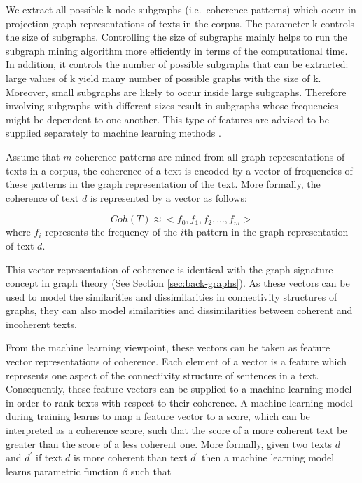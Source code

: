 We extract all possible k-node subgraphs (i.e.\ coherence patterns) which occur in projection graph representations of texts in the corpus. 
The parameter k controls the size of subgraphs.  
Controlling the size of subgraphs mainly helps to run the subgraph mining algorithm more efficiently in terms of the computational time.
In addition, it controls the number of possible subgraphs that can be extracted: large values of k yield many number of possible graphs with the size of k. 
Moreover, small subgraphs are likely to occur inside large subgraphs. 
Therefore involving subgraphs with different sizes result in subgraphs whose frequencies might be dependent to one another.  
This type of features are advised to be supplied separately to machine learning methods \cite{aggarwalcharu18}. 

Assume that $m$ coherence patterns are mined from all graph representations of texts in a corpus, the coherence of a text is encoded by a vector of frequencies of these patterns in the graph representation of the text. 
More formally, the coherence of  text $d$ is represented by a vector as follows:

\begin{equation}
Coh(T) \approx <f_0,f_1,f_2,...,f_m>
\end{equation}
where $f_i$ represents the frequency of the $i${th} pattern in the graph representation of text $d$. 

This vector representation of coherence is identical with the graph signature concept in graph theory (See Section \ref{sec:back-graphs}). 
As these vectors can be used to model the similarities and dissimilarities in connectivity structures of graphs, they can also model similarities and dissimilarities between coherent and incoherent texts. 

From the machine learning viewpoint, these vectors can be taken as feature vector representations of coherence. 
Each element of a vector is a feature which represents one aspect of the connectivity structure of sentences in a text. 
Consequently, these feature vectors can be supplied to a machine learning model in order to rank texts with respect to their coherence. 
A machine learning model during training learns to map a feature vector to a score, which can be interpreted as a coherence score, such that the score of a more coherent text be greater than the score of a less coherent one. 
More formally, given two texts $d$ and $d^\prime$ if text $d$ is more coherent than text $d^\prime$ then a machine learning model learns parametric function $\beta$ such that 


